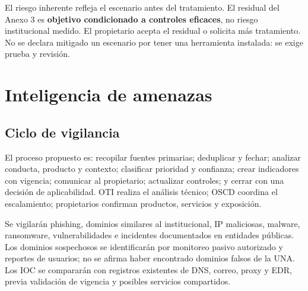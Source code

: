\documentclass[10pt,a4paper]{article}
\begin{document}
El riesgo inherente refleja el escenario antes del tratamiento. El residual del Anexo 3 es \textbf{objetivo condicionado a controles eficaces}, no riesgo institucional medido. El propietario acepta el residual o solicita más tratamiento. No se declara mitigado un escenario por tener una herramienta instalada: se exige prueba y revisión.

\section{Inteligencia de amenazas}
\subsection{Ciclo de vigilancia}
El proceso propuesto es: recopilar fuentes primarias; deduplicar y fechar; analizar conducta, producto y contexto; clasificar prioridad y confianza; crear indicadores con vigencia; comunicar al propietario; actualizar controles; y cerrar con una decisión de aplicabilidad. OTI realiza el análisis técnico; OSCD coordina el escalamiento; propietarios confirman productos, servicios y exposición.

Se vigilarán phishing, dominios similares al institucional, IP maliciosas, malware, ransomware, vulnerabilidades e incidentes documentados en entidades públicas. Los dominios sospechosos se identificarán por monitoreo pasivo autorizado y reportes de usuarios; no se afirma haber encontrado dominios falsos de la UNA. Los IOC se compararán con registros existentes de DNS, correo, proxy y EDR, previa validación de vigencia y posibles servicios compartidos.
\end{document}
